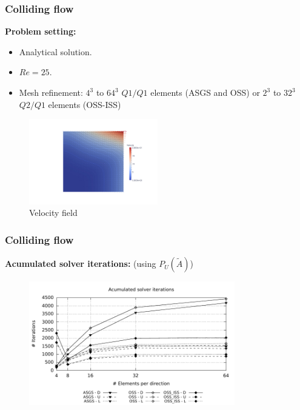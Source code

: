 \begin{frame}
  \frametitle{Colliding flow}
  \textbf{Problem setting:}
  \begin{itemize}
    \itemsep-0.10cm
 	\item Analytical solution.
  	\item $Re=25$. 
  	\item Mesh refinement: $ 4^3 $ to $ 64^3 $ $ Q1/Q1 $ elements (ASGS and OSS) or $ 2^3 $ to $ 32^3 $$ Q2/Q1 $ elements (OSS-ISS)
  \end{itemize}
  \vspace*{-0.3cm}
  \begin{figure}
    \centering	
    \includegraphics[trim=10cm 3.5cm 5cm 3cm, clip=true, width=0.5\textwidth]{Figures/colliding_flow.pdf}
	\vspace*{-0.2cm}
	\caption{Velocity field}
  \end{figure}
\end{frame}
\begin{frame}
 \frametitle{Colliding flow}
 \textbf{Acumulated solver iterations:} (using $ P_U(\widetilde{A}) $)
  \vspace*{-0.25cm}
 \begin{figure}
     \centering	
     \includegraphics[width=0.8\textwidth]{Figures/colliding_iter.pdf}
   \end{figure}
 \begin{overlayarea}{\textwidth}{1.5cm}
  \end{overlayarea}
\end{frame}
